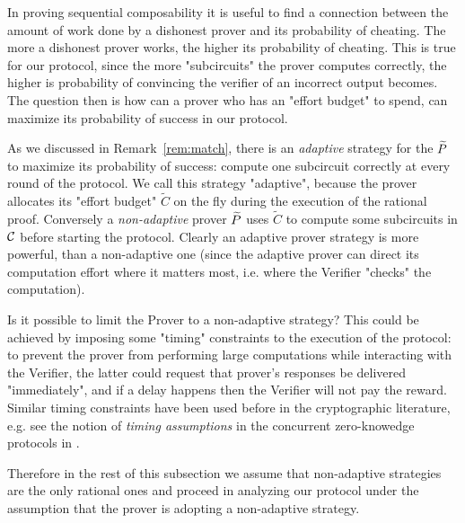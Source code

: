 

\smallskip
\noindent
In proving sequential composability it is useful to find a connection between the amount of work done by a dishonest prover and its probability of cheating. The more a dishonest prover works, the higher its probability of cheating. This is true for our protocol, since the more "subcircuits" the prover computes correctly, the higher is probability of convincing the verifier of an incorrect output becomes. The question then is how can a prover who has an "effort budget" to spend, can maximize its probability of success in our protocol. 

As we discussed in Remark~\ref{rem:match}, there is an {\em adaptive} strategy for the $\widetilde{P}$ to maximize its probability of success: compute one subcircuit correctly at every round of the protocol. We call this strategy "adaptive", because the prover allocates its "effort budget" $\tilde{C}$ on the fly during the execution of the rational proof. Conversely a {\em non-adaptive} prover $\widetilde{P}$ uses $\tilde{C}$ to compute some subcircuits in $\cal C$ before starting the protocol. Clearly an adaptive prover strategy is more powerful, than a non-adaptive one (since the adaptive prover can direct its computation effort where it matters most, i.e. where the Verifier "checks" the computation). 

Is it possible to limit the Prover to a non-adaptive strategy? This could be achieved by imposing some "timing" constraints to the execution of the protocol: to prevent the prover from performing large computations while interacting with the Verifier, the latter could request that prover's responses be delivered "immediately", and if a delay happens then the Verifier will not pay the reward. Similar timing constraints have been used before in the cryptographic literature, e.g. see the notion of {\em timing assumptions} in the concurrent zero-knowedge protocols in \cite{dns}.

Therefore in the rest of this subsection we assume that non-adaptive strategies are the only rational ones and proceed in analyzing our protocol 
under the assumption that the prover is adopting a non-adaptive strategy. 


